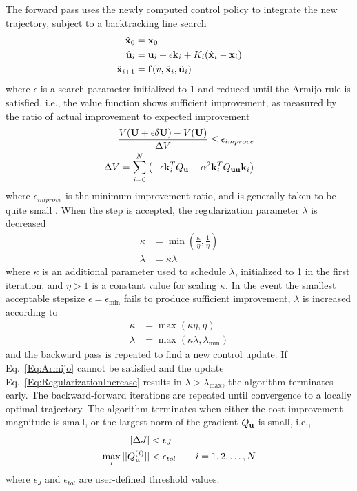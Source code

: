 The forward pass uses the newly computed control policy to integrate the new trajectory, subject to a backtracking line search
\begin{align}
	\hat{\mathbf{x}}_0 &= \mathbf{x}_0 \\
	\hat{\mathbf{u}}_{i} &= \mathbf{u}_i + \epsilon \mathbf{k}_i + K_i(\hat{\mathbf{x}}_i - \mathbf{x}_i)\\
	\hat{\mathbf{x}}_{i+1} &= \mathbf{f}(v, \hat{\mathbf{x}}_i,\hat{\mathbf{u}}_i)
\end{align}
where $\epsilon$ is a search parameter initialized to 1 and reduced until the Armijo rule \cite{Armijo} is satisfied, i.e., the value function shows sufficient improvement, as measured by the ratio of actual improvement to expected improvement
\begin{align}
\frac{V(\mathbf{U} + \epsilon\delta\mathbf{U}) - V(\mathbf{U})}{\Delta V} \le \epsilon_{improve} \label{Eq:Armijo} \\
\Delta V = \sum_{i=0}^{N} \left(-\epsilon\mathbf{k}_i^TQ_{\mathbf{u}} - \alpha^2\mathbf{k}_i^TQ_{\mathbf{u}\mathbf{u}}\mathbf{k}_i \right)
\end{align}
where $\epsilon_{improve}$ is the minimum improvement ratio, and is generally taken to be quite small \cite{Optimization:Nocedal}.
 When the step is accepted, the regularization parameter $\lambda$ is decreased
\begin{align}
\kappa &= \min(\frac{\kappa}{\eta}, \frac{1}{\eta})\\
\lambda &= \kappa\lambda \label{Eq:Regularizationdecrease}
\end{align} 
where $\kappa$ is an additional parameter used to schedule $\lambda$, initialized to 1 in the first iteration, and $\eta>1$ is a constant value for scaling $\kappa$. 
In the event the smallest acceptable stepsize $\epsilon=\epsilon_{\min}$ fails to produce sufficient improvement, $\lambda$ is increased according to
\begin{align}
\kappa &= \max(\kappa\eta, \eta) \\
\lambda &= \max(\kappa\lambda,\lambda_{\min}) \label{Eq:RegularizationIncrease}
\end{align} 
and the backward pass is repeated to find a new control update. If Eq.~\eqref{Eq:Armijo} cannot be satisfied and the update Eq.~\eqref{Eq:RegularizationIncrease} results in $\lambda>\lambda_{\max}$, the algorithm terminates early. 
The backward-forward iterations are repeated until convergence to a locally optimal trajectory. The algorithm terminates when either the cost improvement magnitude is small, or the largest norm of the gradient $Q_{\mathbf{u}}$ is small, i.e.,
\begin{align}
|\Delta J| &< \epsilon_J \label{Eq:ConvergenceCost}\\
\max_i ||Q^{(i)}_{\mathbf{u}}|| &< \epsilon_{tol}\qquad i=1,2,\dots,N \label{Eq:ConvergenceGradient}
\end{align}
where $ \epsilon_J $ and $\epsilon_{tol}$ are user-defined threshold values.

